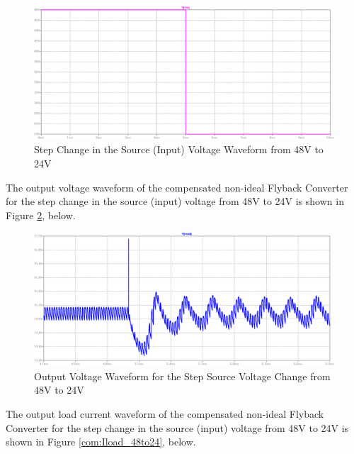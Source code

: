 \begin{figure}[H]
\begin{center}
\includegraphics[width=1\textwidth]{comp_simulations/Vin_48to24.png}
\caption{Step Change in the Source (Input) Voltage Waveform from 48V to 24V}
\label{com:Vin_48to24}
\end{center}
\end{figure}

The output voltage waveform of the compensated non-ideal Flyback Converter for the step change in the source (input) voltage from 48V to 24V is shown in Figure \ref{com:Vout_48to24}, below.

\begin{figure}[H]
\begin{center}
\includegraphics[width=1\textwidth]{comp_simulations/Vout_48to24.png}
\caption{Output Voltage Waveform for the Step Source Voltage Change from 48V to 24V}
\label{com:Vout_48to24}
\end{center}
\end{figure}

The output load current waveform of the compensated non-ideal Flyback Converter for the step change in the source (input) voltage from 48V to 24V is shown in Figure \ref{com:Iload_48to24}, below.

